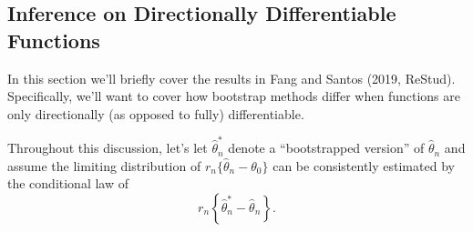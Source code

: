 
\subsection{Inference on Directionally Differentiable Functions}%
\label{subsec:fang-santos-2019}

In this section we'll briefly cover the results in Fang and Santos (2019, ReStud). Specifically, we'll want to cover how bootstrap methods differ when functions are only directionally (as opposed to fully) differentiable.

Throughout this discussion, let's let \(\hat\theta_n^*\) denote a ``bootstrapped version'' of \(\hat\theta_n\) and assume the limiting distribution of \(r_n\{\hat\theta_n-\theta_0\}\) can be consistently estimated by the conditional law of 
\[
    r_n\left\{\hat\theta_n^* - \hat\theta_n\right\}
.\] 

